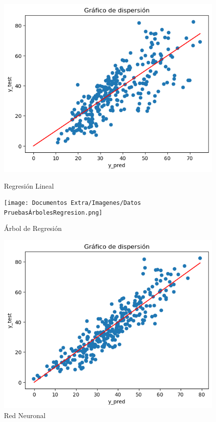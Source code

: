 \begin{figure}[h]
  \centering
  \begin{minipage}{0.32\textwidth}
   
    \includegraphics[width=\textwidth]{Documentos Extra/Imagenes/Datos PruebasRegresionLineal.png}
    \caption{Regresión Lineal}
    \label{fig:regresion_lineal}
  \end{minipage}
  \hfill
  \begin{minipage}{0.32\textwidth}
 
    \texttt{[image: Documentos Extra/Imagenes/Datos PruebasÁrbolesRegresion.png]}
    \caption{Árbol de Regresión}
    \label{fig:regression_tree}
  \end{minipage}
  \begin{minipage}{0.32\textwidth}
    \includegraphics[width=\textwidth]{Documentos Extra/Imagenes/Datos PruebasRedNeuronal.png}
    \caption{Red Neuronal}
    \label{fig:red_neuronal}
  \end{minipage}
 \end{figure}





